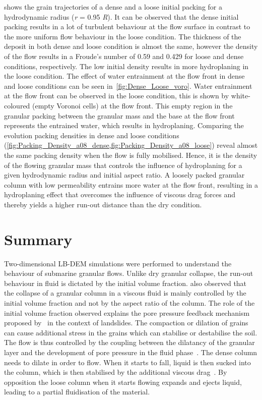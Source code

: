 \documentclass[12pt,a4paper,twocolumn,fleqn]{narms}
\begin{document}
 shows the grain trajectories of a dense and a loose 
initial packing for a hydrodynamic radius (\textit{r} = 0.95 \textit{R}). It 
can be observed that 
the dense initial packing results in a lot of turbulent behaviour at the flow 
surface in contrast to the more uniform flow behaviour in the loose condition. 
The thickness of the deposit in both dense and loose condition is almost the 
same, however the density of the flow results in a Froude's number of 0.59 and
0.429 for loose and dense conditions, respectively. The low initial density 
results in more hydroplaning in the loose condition. The effect of water 
entrainment at the flow front in dense and loose conditions can be seen 
in~\cref{fig:Dense_Loose_voro}. Water entrainment at the flow front can be 
observed in the loose condition, this is shown by white-coloured (empty Voronoi 
cells) at the flow front. This empty region in the granular packing between the 
granular mass and the base at the flow front represents the entrained water, 
which results in hydroplaning. Comparing the evolution packing densities in 
dense and loose conditions
(\cref{fig:Packing_Density_a08_dense,fig:Packing_Density_a08_loose}) 
reveal almost the same packing density when the flow is fully mobilised. Hence, 
it is the density of the flowing granular mass that controls the influence of 
hydroplaning for a given hydrodynamic radius and initial aspect ratio. A 
loosely packed granular column with low permeability entrains 
more water at the flow front, resulting in a hydroplaning effect that overcomes 
the influence of viscous drag forces and thereby yields a higher run-out 
distance than the dry condition.

\section{Summary}

Two-dimensional LB-DEM simulations were performed to understand the behaviour of
submarine granular flows. Unlike dry granular collapse, the run-out behaviour in
fluid is dictated by the initial volume fraction.
 also observed that the collapse of a granular column in a 
viscous fluid is mainly controlled by the initial volume fraction and not by 
the aspect ratio of the column. The role of the initial volume fraction 
observed explains the pore pressure feedback mechanism proposed 
by~ in the context of landslides. The 
compaction or dilation of grains can cause additional stress in the grains 
which can stabilise or destabilise the soil. The flow is thus controlled by the 
coupling between the dilatancy of the granular layer and the development of 
pore pressure in the fluid phase~\cite{Pailha2008}. The dense column needs to 
dilate in order to flow. When it starts to fall, liquid is then sucked into the 
column, which is then stabilised by the additional viscous 
drag~\cite{Rondon2011,Topin2012}. By opposition the loose column when 
it starts flowing expands and ejects liquid, leading to a partial fluidisation 
of the material.
\end{document}
